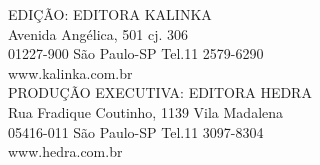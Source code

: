 \mbox{}\vfill
\begin{center}
EDIÇÃO: EDITORA KALINKA\\[7pt]
Avenida Angélica, 501 cj. 306\\[7pt]
01227-900 São Paulo-SP Tel.11 2579-6290\\[7pt]
www.kalinka.com.br\\[30pt]

PRODUÇÃO EXECUTIVA: EDITORA HEDRA\\[7pt]
Rua Fradique Coutinho, 1139 Vila Madalena\\[7pt]
05416-011 São Paulo-SP Tel.11 3097-8304\\[7pt]
www.hedra.com.br
\end{center}
